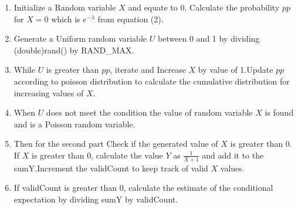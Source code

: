 \documentclass[journal,11pt,twocolumn]{IEEEtran}
\begin{document}
\begin{enumerate}[label=(\Alph*)]
\begin{enumerate}[label=(\roman*)]
	\item Initialize a Random variable $X$ and equate to 0. Calculate the probability $pp$ for $X=0$ which is $e^{-\lambda} $ from equation (2). 
	\item Generate a Uniform random variable $U$ between 0 and 1 by dividing (double)rand() by RAND\_MAX.
	\item While $U$ is greater than $pp$, iterate and Increase $X$ by value of 1.Update $pp$ according to poisson distribution to calculate the cumulative distribution for increasing values of $X$.
	\item When $U$ does not meet the condition the value of random variable $X$ is found and is a Poisson random variable.
	\item Then for the second part Check if the generated value of $X$ is greater than 0. If $X$ is greater than 0, calculate the value $Y$ as $\frac{1}{X + 1}$ and add it to the sumY.Increment the validCount to keep track of valid $X$ values.
	\item If validCount is greater than 0, calculate the  estimate of the conditional expectation by dividing sumY by validCount.

\end{enumerate}
\end{enumerate}
\end{document}
